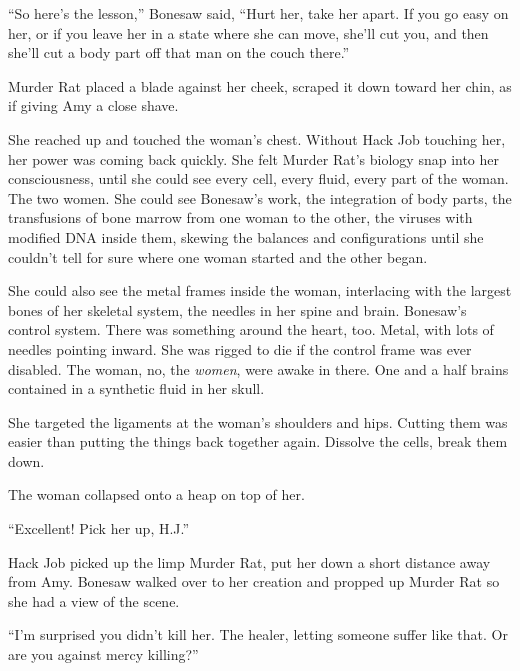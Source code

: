 ``So here's the lesson,'' Bonesaw said, ``Hurt her, take her apart.  If you go easy on her, or if you leave her in a state where she can move, she'll cut you, and then she'll cut a body part off that man on the couch there.''



Murder Rat placed a blade against her cheek, scraped it down toward her chin, as if giving Amy a close shave.



She reached up and touched the woman's chest.  Without Hack Job touching her, her power was coming back quickly.  She felt Murder Rat's biology snap into her consciousness, until she could see every cell, every fluid, every part of the woman.  The two women.  She could see Bonesaw's work, the integration of body parts, the transfusions of bone marrow from one woman to the other, the viruses with modified DNA inside them, skewing the balances and configurations until she couldn't tell for sure where one woman started and the other began.



She could also see the metal frames inside the woman, interlacing with the largest bones of her skeletal system, the needles in her spine and brain.  Bonesaw's control system.  There was something around the heart, too.  Metal, with lots of needles pointing inward.  She was rigged to die if the control frame was ever disabled.  The woman, no, the \emph{women}, were awake in there.  One and a half brains contained in a synthetic fluid in her skull.



She targeted the ligaments at the woman's shoulders and hips.  Cutting them was easier than putting the things back together again.  Dissolve the cells, break them down.



The woman collapsed onto a heap on top of her.



``Excellent!  Pick her up, H.J.''



Hack Job picked up the limp Murder Rat, put her down a short distance away from Amy.  Bonesaw walked over to her creation and propped up Murder Rat so she had a view of the scene.



``I'm surprised you didn't kill her.  The healer, letting someone suffer like that.  Or are you against mercy killing?''



